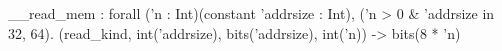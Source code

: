 __read_mem : forall ('n : Int)(constant 'addrsize : Int), ('n > 0 & 'addrsize in {32, 64}).
  (read_kind, int('addrsize), bits('addrsize), int('n)) -> bits(8 * 'n)
